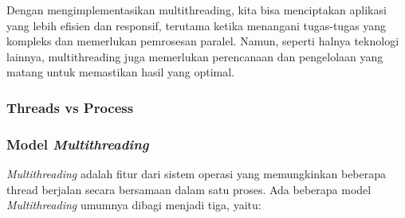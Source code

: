\documentclass[12pt]{article}
\begin{document}
Dengan mengimplementasikan multithreading, kita bisa menciptakan aplikasi yang lebih efisien dan responsif, terutama ketika menangani tugas-tugas yang kompleks dan memerlukan pemrosesan paralel. Namun, seperti halnya teknologi lainnya, multithreading juga memerlukan perencanaan dan pengelolaan yang matang untuk memastikan hasil yang optimal.

\subsubsection{Threads vs Process}
\subsubsection{Model \textit{Multithreading}}
\textit{Multithreading} adalah fitur dari sistem operasi yang memungkinkan beberapa thread berjalan secara bersamaan dalam satu proses.
Ada beberapa model \textit{Multithreading} umumnya dibagi menjadi tiga, yaitu:
\end{document}
